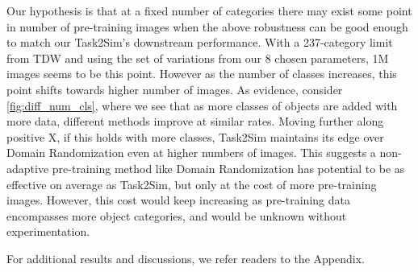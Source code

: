 Our hypothesis is that at a fixed number of categories there may exist some point in number of pre-training images when the above robustness can be good enough to match our Task2Sim's downstream performance. With a 237-category limit from TDW and using the set of variations from our 8 chosen parameters, 1M images seems to be this point. However as the number of classes increases, this point shifts towards higher number of images. As evidence, consider \cref{fig:diff_num_cls}, where we see that as more classes of objects are added with more data, different methods improve at similar rates. Moving further along positive X, if this holds with more classes, Task2Sim maintains its edge over Domain Randomization even at higher numbers of images. This suggests a non-adaptive pre-training method like Domain Randomization has potential to be as effective on average as Task2Sim, but only at the cost of more pre-training images. However, this cost would keep increasing as pre-training data encompasses more object categories, and would be unknown without experimentation. 

For additional results and discussions, we refer readers to the Appendix.
















